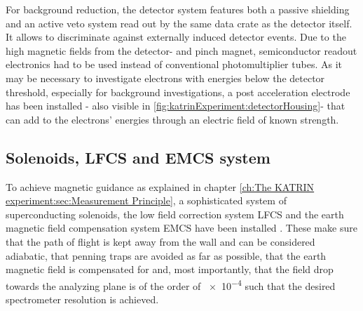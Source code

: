       
      For background reduction, the detector system features both a passive shielding and an active veto system read out by the same data crate as the detector itself. It allows to discriminate against externally induced detector events. Due to the high magnetic fields from the detector- and pinch magnet, semiconductor readout electronics had to be used instead of conventional photomultiplier tubes.
      As it may be necessary to investigate electrons with energies below the detector threshold, especially for background investigations, a post acceleration electrode has been installed - also visible in \ref{fig:katrinExperiment:detectorHousing}- that can add to the electrons' energies through an electric field of known strength.
      
      \subsection{Solenoids, LFCS and EMCS system}
      \label{ch:The KATRIN experiment:sec:Experimental setup:subsec:Solenoids, LFCS and EMCS system}
      
      To achieve magnetic guidance as explained in chapter \ref{ch:The KATRIN experiment:sec:Measurement Principle}, a sophisticated system of superconducting solenoids, the low field correction system LFCS and the earth magnetic field compensation system EMCS have been installed \cite{airCoilSystem}. These make sure that the path of flight is kept away from the wall and can be considered adiabatic, that penning traps are avoided as far as possible, that the earth magnetic field is compensated for and, most importantly, that the field drop towards the analyzing plane is of the order of \SI{e-4}{} such that the desired spectrometer resolution is achieved.
      

